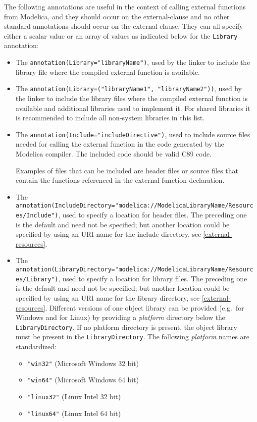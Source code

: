 The following annotations are useful in the context of calling external functions from Modelica, and they should occur on the external-clause and no other standard annotations should occur on the external-clause.
They can all specify either a scalar value or an array of values as indicated below for the \lstinline!Library! annotation:
\begin{itemize}
\item
  The \lstinline!annotation(Library="libraryName")!, used by the linker to include the library file where the compiled external function is available.
\item
  The \lstinline!annotation(Library=("libraryName1", "libraryName2"))!, used by the linker to include the library files where the compiled external function is available and additional libraries used to implement it.
  For shared libraries it is recommended to include all non-system libraries in this list.
\item
  The \lstinline!annotation(Include="includeDirective")!, used to include source files needed for calling the external function in the code generated by the Modelica compiler.
  The included code should be valid C89 code.
  \begin{nonnormative}
  Examples of files that can be included are header files or source files that contain the functions referenced in the external function declaration.
  \end{nonnormative}
\item
  The
  \lstinline!annotation(IncludeDirectory="modelica://ModelicaLibraryName/Resources/Include")!, used to specify a location for header files.
  The preceding one is the default and need not be specified; but another location could be specified by using an URI name for the include directory, see \cref{external-resources}.
\item
  The
  \lstinline!annotation(LibraryDirectory="modelica://ModelicaLibraryName/Resources/Library")!, used to specify a location for library files.
  The preceding one is the default and need not be specified; but another location could be specified by using an URI name for the library directory, see \cref{external-resources}.
  Different versions of one object library can be provided (e.g.\ for Windows and for Linux) by providing a \emph{platform} directory below the \lstinline!LibraryDirectory!.
  If no platform directory is present, the object library must be present in the \lstinline!LibraryDirectory!.
  The following \emph{platform} names are standardized:
  \begin{itemize}
  \item
    \lstinline!"win32"! (Microsoft Windows 32 bit)
  \item
    \lstinline!"win64"! (Microsoft Windows 64 bit)
  \item
    \lstinline!"linux32"! (Linux Intel 32 bit)
  \item
    \lstinline!"linux64"! (Linux Intel 64 bit)
  \end{itemize}
\end{itemize}

